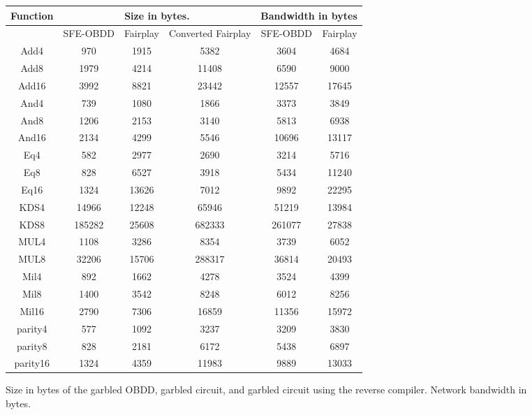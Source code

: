 %
\begin{figure*}


\begin{center}\begin{tabular}{|c||c|c|c||c|c|}
\hline 
Function & \multicolumn{3}{c|}{\sf Size in bytes.} & \multicolumn{2}{c|}{\sf Bandwidth in bytes} \\ 
\hline 
	&  SFE-OBDD & Fairplay & Converted Fairplay & SFE-OBDD & Fairplay\\ \hline

Add4 & 970 & 1915 & 5382 & 3604 & 4684 \tabularnewline \hline
Add8 & 1979 & 4214 & 11408 & 6590 & 9000 \tabularnewline \hline
Add16 & 3992 & 8821 & 23442 & 12557 & 17645 \tabularnewline \hline
And4 & 739 & 1080 & 1866 & 3373 & 3849 \tabularnewline \hline
And8 & 1206 & 2153 & 3140 & 5813 & 6938 \tabularnewline \hline
And16 & 2134 & 4299 & 5546 & 10696 & 13117 \tabularnewline \hline
Eq4 & 582 & 2977 & 2690 & 3214 & 5716 \tabularnewline \hline
Eq8 & 828 & 6527 & 3918 & 5434 & 11240 \tabularnewline \hline
Eq16 & 1324 & 13626 & 7012 & 9892 & 22295 \tabularnewline \hline
KDS4 & 14966 & 12248 & 65946 & 51219 & 13984 \tabularnewline \hline
KDS8 & 185282 & 25608 & 682333 & 261077 & 27838 \tabularnewline \hline
MUL4 & 1108 & 3286 & 8354 & 3739 & 6052 \tabularnewline \hline
MUL8 & 32206 & 15706 & 288317 & 36814 & 20493 \tabularnewline \hline
Mil4 & 892 & 1662 & 4278 & 3524 & 4399 \tabularnewline \hline
Mil8 & 1400 & 3542 & 8248 & 6012 & 8256 \tabularnewline \hline
Mil16 & 2790 & 7306 & 16859 & 11356 & 15972 \tabularnewline \hline
parity4 & 577 & 1092 & 3237 & 3209 & 3830 \tabularnewline \hline
parity8 & 828 & 2181 & 6172 & 5438 & 6897 \tabularnewline \hline
parity16 & 1324 & 4359 & 11983 & 9889 & 13033 \tabularnewline \hline

\end{tabular}\end{center}

\caption{\label{table:size-bandwidth}Size in bytes of the garbled OBDD, garbled circuit, and garbled circuit using the
reverse compiler. Network bandwidth in  bytes.}

\end{figure*}

